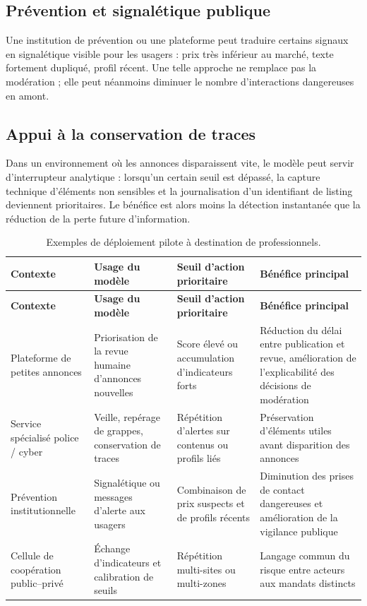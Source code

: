 \documentclass[10pt,a4paper]{article}
\begin{document}
\subsection{Prévention et signalétique publique}
Une institution de prévention ou une plateforme peut traduire certains signaux en signalétique visible pour les usagers : prix très inférieur au marché, texte fortement dupliqué, profil récent. Une telle approche ne remplace pas la modération ; elle peut néanmoins diminuer le nombre d'interactions dangereuses en amont.

\subsection{Appui à la conservation de traces}
Dans un environnement où les annonces disparaissent vite, le modèle peut servir d'interrupteur analytique : lorsqu'un certain seuil est dépassé, la capture technique d'éléments non sensibles et la journalisation d'un identifiant de listing deviennent prioritaires. Le bénéfice est alors moins la détection instantanée que la réduction de la perte future d'information.

\begin{longtable}{p{3.1cm} p{4.2cm} p{3.4cm} p{4.2cm}}
\caption{Exemples de déploiement pilote à destination de professionnels.}\\
\toprule
\textbf{Contexte} & \textbf{Usage du modèle} & \textbf{Seuil d'action prioritaire} & \textbf{Bénéfice principal} \\
\midrule
\endfirsthead
\toprule
\textbf{Contexte} & \textbf{Usage du modèle} & \textbf{Seuil d'action prioritaire} & \textbf{Bénéfice principal} \\
\midrule
\endhead
Plateforme de petites annonces & Priorisation de la revue humaine d'annonces nouvelles & Score élevé ou accumulation d'indicateurs forts & Réduction du délai entre publication et revue, amélioration de l'explicabilité des décisions de modération \\
Service spécialisé police / cyber & Veille, repérage de grappes, conservation de traces & Répétition d'alertes sur contenus ou profils liés & Préservation d'éléments utiles avant disparition des annonces \\
Prévention institutionnelle & Signalétique ou messages d'alerte aux usagers & Combinaison de prix suspects et de profils récents & Diminution des prises de contact dangereuses et amélioration de la vigilance publique \\
Cellule de coopération public--privé & Échange d'indicateurs et calibration de seuils & Répétition multi-sites ou multi-zones & Langage commun du risque entre acteurs aux mandats distincts \\
\bottomrule
\end{longtable}
\end{document}
